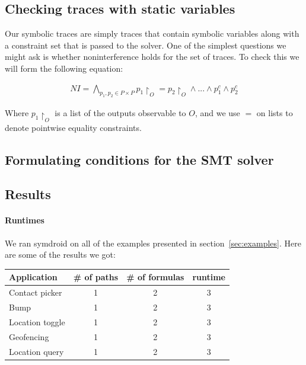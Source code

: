 \documentclass[conference]{IEEEtran}
\theoremstyle{definition}
\newcommand{\prin}{\textit{O}}
\newcommand{\restrict}{\upharpoonright}
\begin{document}
\subsection{Checking traces with static variables}

Our symbolic traces are simply traces that contain symbolic variables
along with a constraint set that is passed to the solver.  One of the
simplest questions we might ask is whether noninterference holds for
the set of traces.  To check this we will form the following equation:

\begin{displaymath}
  \begin{array}{c}
    NI = \bigwedge\limits_{p_1 , p_2 \in P \times P} p_1
    \restrict_{\prin} = p_2 \restrict_{\prin}
    \wedge ... \wedge p_1^c \wedge p_2^c
  \end{array}
\end{displaymath}
  
Where $p_1\restrict_{\prin}$ is a list of the outputs observable to
$\prin$, and we use $=$ on lists to denote pointwise equality
constraints.

\subsection{Formulating conditions for the SMT solver}

\subsection{Results}

\paragraph*{Runtimes}

We ran symdroid on all of the examples presented in
section~\ref{sec:examples}.  Here are some of the results we got:

\begin{tabular}{ | l || c | c | c | }
  \hline 
  Application & \# of paths & \# of formulas & runtime \\
  \hline
  Contact picker & 1 & 2 & 3 \\
  Bump & 1 & 2 & 3 \\
  Location toggle & 1 & 2 & 3 \\
  Geofencing & 1 & 2 & 3 \\
  Location query & 1 & 2 & 3 \\
  \hline
\end{tabular}
\end{document}
